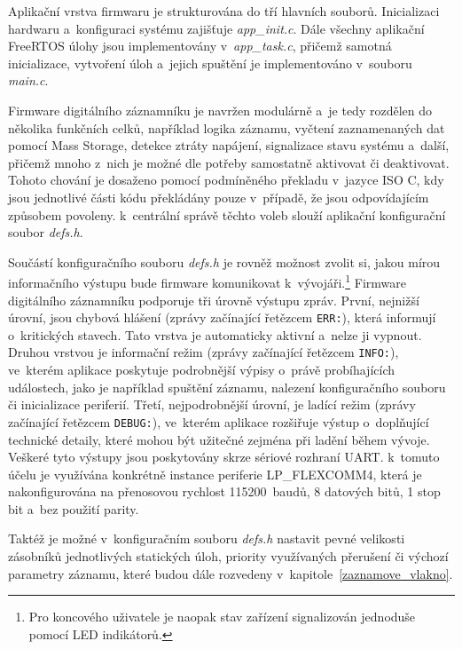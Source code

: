 Aplikační vrstva firmwaru je strukturována do tří hlavních souborů. Inicializaci hardwaru a~konfiguraci systému zajišťuje \textit{app\_init.c}. Dále všechny aplikační FreeRTOS úlohy jsou implementovány v~\textit{app\_task.c}, přičemž samotná inicializace, vytvoření úloh a~jejich spuštění je implementováno v~souboru \textit{main.c}.

Firmware digitálního záznamníku je navržen modulárně a~je tedy rozdělen do několika funkčních celků, například logika záznamu, vyčtení zaznamenaných dat pomocí Mass Storage, detekce ztráty napájení, signalizace stavu systému a~další, přičemž mnoho z~nich je možné dle potřeby samostatně aktivovat či deaktivovat. Tohoto chování je dosaženo pomocí podmíněného překladu v~jazyce ISO C, kdy jsou jednotlivé části kódu překládány pouze v~případě, že jsou odpovídajícím způsobem povoleny. k~centrální správě těchto voleb slouží aplikační konfigurační soubor \textit{defs.h}. 

Součástí konfiguračního souboru \textit{defs.h} je rovněž možnost zvolit si, jakou mírou informačního výstupu bude firmware komunikovat k~vývojáři.\footnote{Pro koncového uživatele je naopak stav zařízení signalizován jednoduše pomocí LED indikátorů.} Firmware digitálního záznamníku podporuje tři úrovně výstupu zpráv. První, nejnižší úrovní, jsou chybová hlášení (zprávy začínající řetězcem \texttt{ERR:}), která informují o~kritických stavech. Tato vrstva je automaticky aktivní a~nelze ji vypnout. Druhou vrstvou je informační režim (zprávy začínající řetězcem \texttt{INFO:}), ve~kterém aplikace poskytuje podrobnější výpisy o~právě probíhajících událostech, jako je například spuštění záznamu, nalezení konfiguračního souboru či inicializace periferií. Třetí, nejpodrobnější úrovní, je ladící režim (zprávy začínající řetězcem \texttt{DEBUG:}), ve~kterém aplikace rozšiřuje výstup o~doplňující technické detaily, které mohou být užitečné zejména při ladění během vývoje. Veškeré tyto výstupy jsou poskytovány skrze sériové rozhraní UART. k~tomuto účelu je využívána konkrétně instance periferie LP\_FLEXCOMM4, která je nakonfigurována na přenosovou rychlost 115200~baudů, 8 datových bitů, 1 stop bit a~bez použití parity.

Taktéž je možné v~konfiguračním souboru \textit{defs.h} nastavit pevné velikosti zásobníků jednotlivých statických úloh, priority využívaných přerušení či výchozí parametry záznamu, které budou dále rozvedeny v~kapitole~\ref{zaznamove_vlakno}. 

